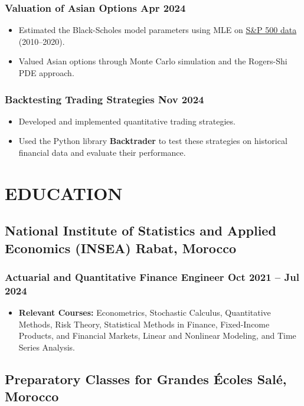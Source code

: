 \documentclass[11pt]{amdresume}
\begin{document}
\subsubsection{Valuation of Asian Options \dotfill Apr 2024}
\begin{itemize}
    \item Estimated the Black-Scholes model parameters using MLE on \href{https://finance.yahoo.com/quote/%5EGSPC/history/}{S\&P 500 data} (2010–2020).
    \item Valued Asian options through Monte Carlo simulation and the Rogers-Shi PDE approach.
\end{itemize}

\subsubsection{Backtesting Trading Strategies \dotfill Nov 2024}
\begin{itemize}
    \item Developed and implemented quantitative trading strategies.
    \item Used the Python library \textbf{Backtrader} to test these strategies on historical financial data and evaluate their performance.
\end{itemize}

\section{EDUCATION}

\subsection{National Institute of Statistics and Applied Economics (INSEA) \hfill Rabat, Morocco}
\subsubsection{Actuarial and Quantitative Finance Engineer \dotfill Oct 2021 – Jul 2024}
\begin{itemize}
\item \textbf{Relevant Courses:} Econometrics, Stochastic Calculus, Quantitative Methods, Risk Theory, Statistical Methods in Finance, Fixed-Income Products, and Financial Markets, Linear and Nonlinear Modeling, and Time Series Analysis.
\end{itemize}

\subsection{Preparatory Classes for Grandes Écoles \hfill Salé, Morocco}
\end{document}
